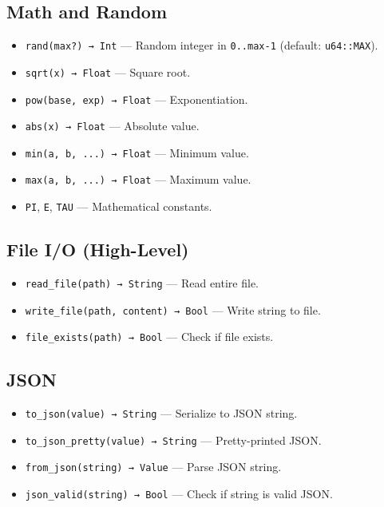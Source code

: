 \subsection{Math and Random}
\begin{itemize}
    \item \texttt{rand(max?) → Int} — Random integer in \texttt{0..max-1} (default: \texttt{u64::MAX}).
    \item \texttt{sqrt(x) → Float} — Square root.
    \item \texttt{pow(base, exp) → Float} — Exponentiation.
    \item \texttt{abs(x) → Float} — Absolute value.
    \item \texttt{min(a, b, ...) → Float} — Minimum value.
    \item \texttt{max(a, b, ...) → Float} — Maximum value.
    \item \texttt{PI}, \texttt{E}, \texttt{TAU} — Mathematical constants.
\end{itemize}

\subsection{File I/O (High-Level)}
\begin{itemize}
    \item \texttt{read\_file(path) → String} — Read entire file.
    \item \texttt{write\_file(path, content) → Bool} — Write string to file.
    \item \texttt{file\_exists(path) → Bool} — Check if file exists.
\end{itemize}

\subsection{JSON}
\begin{itemize}
    \item \texttt{to\_json(value) → String} — Serialize to JSON string.
    \item \texttt{to\_json\_pretty(value) → String} — Pretty-printed JSON.
    \item \texttt{from\_json(string) → Value} — Parse JSON string.
    \item \texttt{json\_valid(string) → Bool} — Check if string is valid JSON.
\end{itemize}

